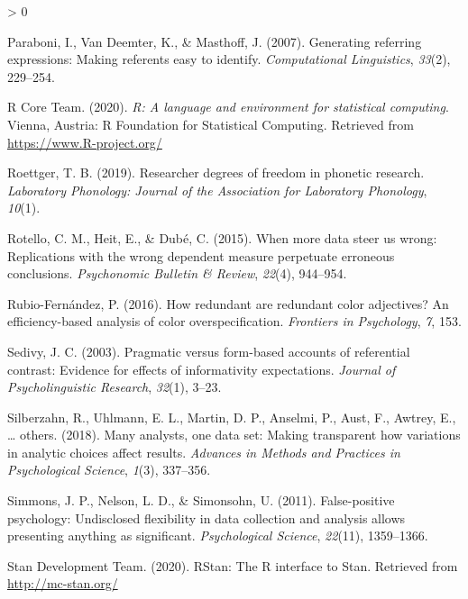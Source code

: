 \documentclass[
  english,
  man,floatsintext]{apa6}
\newlength{\cslhangindent}
\newenvironment{CSLReferences}[2] %
 {%
  \setlength{\parindent}{0pt}
  \ifodd #1 \everypar{\setlength{\hangindent}{\cslhangindent}}\ignorespaces\fi
  \ifnum #2 > 0
  \setlength{\parskip}{#2\baselineskip}
  \fi
 }%
 {}
\begin{document}
\begin{CSLReferences}{1}{0}
\leavevmode\hypertarget{ref-paraboni2007generating}{}%
Paraboni, I., Van Deemter, K., \& Masthoff, J. (2007). Generating referring expressions: Making referents easy to identify. \emph{Computational Linguistics}, \emph{33}(2), 229--254.

\leavevmode\hypertarget{ref-R-base}{}%
R Core Team. (2020). \emph{R: A language and environment for statistical computing}. Vienna, Austria: R Foundation for Statistical Computing. Retrieved from \url{https://www.R-project.org/}

\leavevmode\hypertarget{ref-roettger2019researcher}{}%
Roettger, T. B. (2019). Researcher degrees of freedom in phonetic research. \emph{Laboratory Phonology: Journal of the Association for Laboratory Phonology}, \emph{10}(1).

\leavevmode\hypertarget{ref-rotello2015more}{}%
Rotello, C. M., Heit, E., \& Dubé, C. (2015). When more data steer us wrong: {R}eplications with the wrong dependent measure perpetuate erroneous conclusions. \emph{Psychonomic Bulletin \& Review}, \emph{22}(4), 944--954.

\leavevmode\hypertarget{ref-rubio2016redundant}{}%
Rubio-Fernández, P. (2016). How redundant are redundant color adjectives? An efficiency-based analysis of color overspecification. \emph{Frontiers in Psychology}, \emph{7}, 153.

\leavevmode\hypertarget{ref-sedivy2003pragmatic}{}%
Sedivy, J. C. (2003). Pragmatic versus form-based accounts of referential contrast: Evidence for effects of informativity expectations. \emph{Journal of Psycholinguistic Research}, \emph{32}(1), 3--23.

\leavevmode\hypertarget{ref-silberzahn2018many}{}%
Silberzahn, R., Uhlmann, E. L., Martin, D. P., Anselmi, P., Aust, F., Awtrey, E., \ldots{} others. (2018). Many analysts, one data set: Making transparent how variations in analytic choices affect results. \emph{Advances in Methods and Practices in Psychological Science}, \emph{1}(3), 337--356.

\leavevmode\hypertarget{ref-simmons2011false}{}%
Simmons, J. P., Nelson, L. D., \& Simonsohn, U. (2011). False-positive psychology: Undisclosed flexibility in data collection and analysis allows presenting anything as significant. \emph{Psychological Science}, \emph{22}(11), 1359--1366.

\leavevmode\hypertarget{ref-stan2020a}{}%
Stan Development Team. (2020). {RStan}: The {R} interface to {Stan}. Retrieved from \url{http://mc-stan.org/}


\end{CSLReferences}
\end{document}
